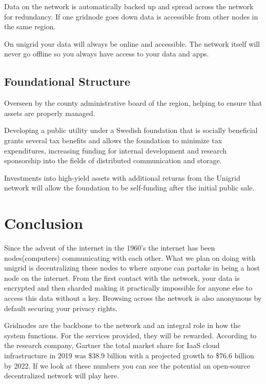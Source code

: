 \documentclass[12pt]{article}
\begin{document}
Data on the network is automatically backed up and spread across the network for redundancy. If one gridnode goes down data is accessible from other nodes in the same region.

On unigrid your data will always be online and accessible. The network itself will never go offline so you always have access to your data and apps.

\subsection*{Foundational Structure}
Overseen by the county administrative board of the region, helping to ensure that assets are properly managed.

Developing a public utility under a Swedish foundation that is socially beneficial grants several tax benefits and allows the foundation to minimize tax expenditures, increasing funding for internal development and research sponsorship into the fields of distributed communication and storage.

Investments into high-yield assets with additional returns from the Unigrid network will allow the foundation to be self-funding after the initial public sale.


\section*{Conclusion}

Since the advent of the internet in the 1960's\cite{int1997} the internet has been nodes(computers) communicating with each other. What we plan on doing with unigrid is decentralizing these nodes to where anyone can partake in being a host node on the internet. From the first contact with the network, your data is encrypted and then sharded making it practically impossible for anyone else to access this data without a key. Browsing across the network is also anonymous by default securing your privacy rights.

Gridnodes are the backbone to the network and an integral role in how the system functions. For the services provided, they will be rewarded. According to the research company, Gartner the total market share for IaaS cloud infrastructure in 2019 was \$38.9 billion with a projected growth to \$76.6 billion by 2022\cite{gartner2019}. If we look at these numbers you can see the potential an open-source decentralized network will play here.
\end{document}
